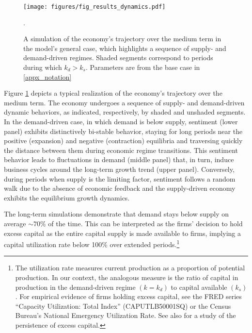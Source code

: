 \documentclass[authoryear, review]{elsarticle}
\begin{document}

\begin{figure}[hbt!]
	\centering
	\texttt{[image: figures/fig\_results\_dynamics.pdf]}
	\caption{A simulation of the economy's trajectory over the medium term in the model's general case, which highlights a sequence of supply- and demand-driven regimes. Shaded segments correspond to periods during which $k_d>k_s$. Parameters are from the base case in \ref{appx_notation}}.
	\label{fig_results_dynamics}
\end{figure}

Figure \ref{fig_results_dynamics} depicts a typical realization of the economy's trajectory over the medium term. The economy undergoes a sequence of supply- and demand-driven dynamic behaviors, as indicated, respectively, by shaded and unshaded segments. In the demand-driven case, in which demand is below supply, sentiment (lower panel) exhibits distinctively bi-stable behavior, staying for long periods near the positive (expansion) and negative (contraction) equilibria and traversing quickly the distance between them during economic regime transitions. This sentiment behavior leads to fluctuations in demand (middle panel) that, in turn, induce business cycles around the long-term growth trend (upper panel). Conversely, during periods when supply is the limiting factor, sentiment follows a random walk due to the absence of economic feedback and the supply-driven economy exhibits the equilibrium growth dynamics. 

The long-term simulations demonstrate that demand stays below supply on average $\sim70\%$ of the time. This can be interpreted as the firms' decision to hold excess capital \citep[as, for example, noted in][]{Fair2020} as the entire capital supply is made available to firms, implying a capital utilization rate below 100\% over extended periods.\footnote{The utilization rate measures current production as a proportion of potential production. In our context, the analogous measure is the ratio of capital in production in the demand-driven regime $(k=k_d)$ to capital available $(k_s)$. For empirical evidence of firms holding excess capital, see the FRED series ``Capacity Utilization: Total Index'' (CAPUTLB50001SQ) or the Census Bureau's National Emergency Utilization Rate. See also \citet{Murphy2017} for a study of the persistence of excess capital.}
\end{document}
